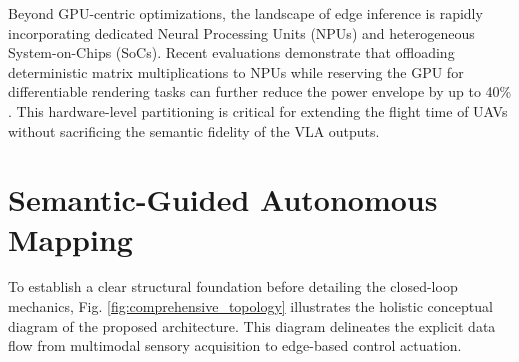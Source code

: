 \documentclass[conference]{IEEEtran}
\begin{document}
Beyond GPU-centric optimizations, the landscape of edge inference is rapidly incorporating dedicated Neural Processing Units (NPUs) and heterogeneous System-on-Chips (SoCs). Recent evaluations demonstrate that offloading deterministic matrix multiplications to NPUs while reserving the GPU for differentiable rendering tasks can further reduce the power envelope by up to 40\% \cite{10938499}. This hardware-level partitioning is critical for extending the flight time of UAVs without sacrificing the semantic fidelity of the VLA outputs.

\section{Semantic-Guided Autonomous Mapping}
\label{sec:semantic_mapping}

To establish a clear structural foundation before detailing the closed-loop mechanics, Fig. \ref{fig:comprehensive_topology} illustrates the holistic conceptual diagram of the proposed architecture. This diagram delineates the explicit data flow from multimodal sensory acquisition to edge-based control actuation.
\end{document}
